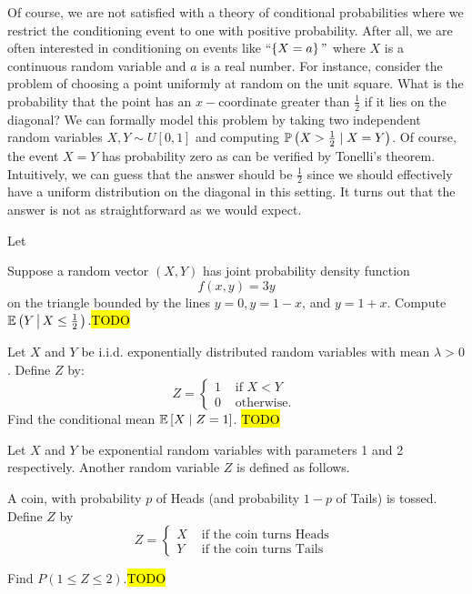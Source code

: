 Of course, we are not satisfied with a theory of conditional probabilities
where we restrict the conditioning event to one with positive probability.
After all, we are often interested in conditioning on events like
``$\left\{ X=a\right\} "$ where $X$ is a continuous random variable
and $a$ is a real number. For instance, consider the problem of choosing
a point uniformly at random on the unit square. What is the probability
that the point has an $x-$coordinate greater than $\frac{1}{2}$
if it lies on the diagonal? We can formally model this problem by
taking two independent random variables $X,Y\sim U\left[0,1\right]$
and computing $\P\left(X>\frac{1}{2}\mid X=Y\right)$. Of course,
the event $X=Y$ has probability zero as can be verified by Tonelli's
theorem. Intuitively, we can guess that the answer should be $\frac{1}{2}$
since we should effectively have a uniform distribution on the diagonal
in this setting. It turns out that the answer is not as straightforward
as we would expect.
\begin{example}
\label{exa:borelKolmogorov}Let 
\end{example}

\begin{example}
\label{exa:isi2004samplepsb3}Suppose a random vector $(X,Y)$ has
joint probability density function 
\[
f(x,y)=3y
\]
 on the triangle bounded by the lines $y=0,y=1-x$, and $y=1+x$.
Compute $\E\left(Y\left\lvert \,X\leq\frac{1}{2}\right.\right)$.\hl{TODO}
\end{example}

\begin{example}
\label{exa:isi2007samplepsb7}Let $X$ and $Y$ be i.i.d. exponentially
distributed random variables with mean $\lambda>0$. Define $Z$ by:
\[
Z=\begin{cases}
1 & \text{ if }X<Y\\
0 & \text{ otherwise. }
\end{cases}
\]
Find the conditional mean $\E\left[X\mid Z=1\right]$. \hl{TODO}
\end{example}

\begin{example}
\label{exa:isi2008samplepsb7}Let $X$ and $Y$ be exponential random
variables with parameters 1 and 2 respectively. Another random variable
$Z$ is defined as follows.

A coin, with probability $p$ of Heads (and probability $1-p$ of
Tails) is tossed. Define $Z$ by 
\[
Z=\begin{cases}
X & \text{ if the coin turns Heads }\\
Y & \text{ if the coin turns Tails }
\end{cases}
\]

Find $P(1\leq Z\leq2)$.\hl{TODO}
\end{example}


